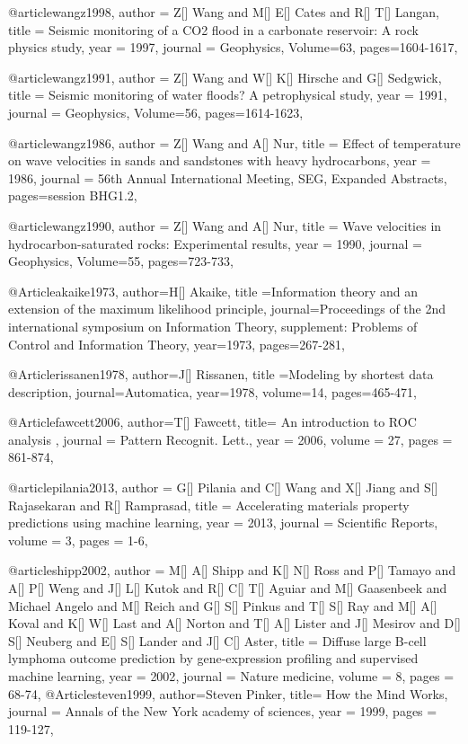 @article{wangz1998,
  author =	 {Z[] Wang and M[] E[] Cates and R[] T[] Langan},
  title =	 {Seismic monitoring of a CO2 flood in a carbonate reservoir: A rock physics study},
  year =	 1997,
  journal =	 {Geophysics},
    Volume=63,
 pages=1604-1617,
}

@article{wangz1991,
  author =	 {Z[] Wang and W[] K[] Hirsche and G[] Sedgwick},
  title =	 {Seismic monitoring of water floods? A petrophysical study},
  year =	 1991,
  journal =	 {Geophysics},
    Volume=56,
 pages=1614-1623,
}

@article{wangz1986,
  author =	 {Z[] Wang and A[] Nur},
  title =	 {Effect of temperature on wave velocities in
sands and sandstones with heavy hydrocarbons},
  year =	 1986,
 journal =	 {56th Annual International Meeting, SEG, Expanded Abstracts},
 pages=session BHG1.2,
}

@article{wangz1990,
  author =	 {Z[] Wang and A[] Nur},
  title =	 {Wave velocities in hydrocarbon-saturated rocks: Experimental results},
  year =	 1990,
  journal =	 {Geophysics},
    Volume=55,
 pages=723-733,
}


@Article{akaike1973,
  author={H[] Akaike},
  title ={Information theory and an extension of the maximum likelihood principle},
  journal={Proceedings of the 2nd international symposium on Information Theory, supplement: Problems of Control and Information Theory},
  year=1973,
  pages={267-281},
}

@Article{rissanen1978,
  author={J[] Rissanen},
  title ={Modeling by shortest data description},
  journal={Automatica},
  year=1978,
  volume=14,
  pages={465-471},
}

@Article{fawcett2006,
  author={T[] Fawcett},
  title={ An introduction to ROC analysis },
  journal = 	 {Pattern Recognit. Lett.},
  year = 	 2006,
  volume =	 27,
  pages =	 {861-874},
}

@article{pilania2013,
author = {G[] Pilania and C[] Wang and X[] Jiang and S[] Rajasekaran and R[] Ramprasad},
title = {Accelerating materials property predictions using machine learning},
year = {2013},
journal = {Scientific Reports},
volume = {3},
pages = {1-6},
}

@article{shipp2002,
author = {M[] A[] Shipp and K[] N[] Ross and P[] Tamayo and A[] P[] Weng and J[] L[] Kutok and R[] C[] T[] Aguiar and M[] Gaasenbeek and Michael Angelo and M[] Reich and G[] S[] Pinkus and T[] S[] Ray and M[] A[] Koval and K[] W[] Last and A[] Norton and T[] A[] Lister and J[] Mesirov and D[] S[] Neuberg and E[] S[] Lander and J[] C[] Aster},
title = {Diffuse large B-cell lymphoma outcome prediction by gene-expression profiling and supervised machine learning},
year = {2002},
journal = {Nature medicine},
volume = {8},
pages = {68-74},
}
@Article{steven1999,
  author={Steven Pinker},
  title={ How the Mind Works},
  journal = 	 {Annals of the New York academy of sciences},
  year = 	 1999,
  pages =	 {119-127},
}

